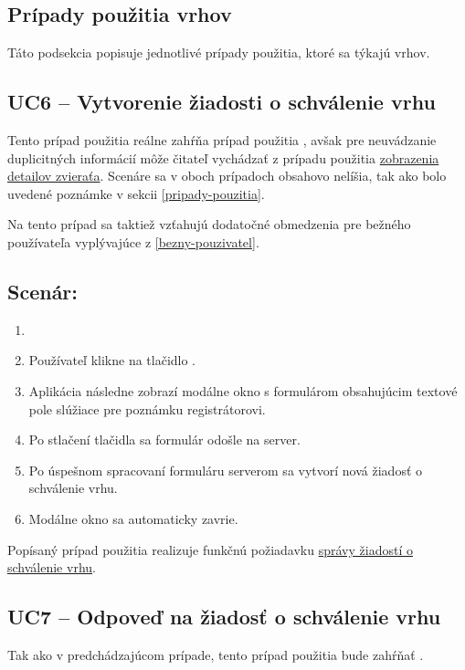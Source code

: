 \subsection{Prípady použitia vrhov}
Táto podsekcia popisuje jednotlivé prípady použitia, ktoré sa týkajú vrhov.

\subsection*{UC6 -- Vytvorenie žiadosti o schválenie vrhu}

Tento prípad použitia reálne zahŕňa prípad použitia , avšak pre neuvádzanie duplicitných informácií môže čitateľ vychádzať z prípadu použitia \hyperref[uc2]{zobrazenia detailov zvieraťa}. Scenáre sa v oboch prípadoch obsahovo nelíšia, tak ako bolo uvedené poznámke v sekcii \ref{pripady-pouzitia}.

Na tento prípad sa taktiež vzťahujú dodatočné obmedzenia pre bežného používateľa vyplývajúce z \ref{bezny-pouzivatel}.

\subsection*{Scenár:}

\begin{enumerate}
	\item {}
	\item Používateľ klikne na tlačidlo .
	\item Aplikácia následne zobrazí modálne okno s formulárom obsahujúcim textové pole slúžiace pre poznámku registrátorovi.
	\item Po stlačení tlačidla  sa formulár odošle na server.
	\item Po úspešnom spracovaní formuláru serverom sa vytvorí nová žiadosť o schválenie vrhu.
	\item Modálne okno sa automaticky zavrie.
\end{enumerate}

Popísaný prípad použitia realizuje funkčnú požiadavku \hyperref[sprava-ziadosti-o-schvalenie-vrhu]{správy žiadostí o schválenie vrhu}.

\subsection*{UC7 -- Odpoveď na žiadosť o schválenie vrhu}

Tak ako v predchádzajúcom prípade, tento prípad použitia bude zahŕňať .

